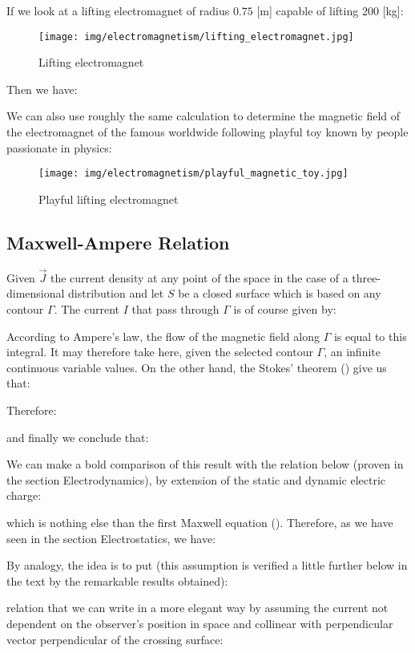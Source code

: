 	If we look at a lifting electromagnet of radius $0.75$ [m] capable of lifting $200$ [kg]:
	\begin{figure}[H]
		\centering
		\texttt{[image: img/electromagnetism/lifting\_electromagnet.jpg]}
		\caption{Lifting electromagnet}
	\end{figure}
	Then we have:
	
	We can also use roughly the same calculation to determine the magnetic field of the electromagnet of the famous worldwide following playful toy known by people passionate in physics:
	\begin{figure}[H]
		\centering
		\texttt{[image: img/electromagnetism/playful\_magnetic\_toy.jpg]}
		\caption{Playful lifting electromagnet}
	\end{figure}
	
	\pagebreak
	\subsection{Maxwell-Ampere Relation}
	Given $\vec{J}$ the current density at any point of the space in the case of a three-dimensional distribution and let $S$ be a closed surface which is based on any contour $\Gamma$. The current $I$ that pass through $\Gamma$ is of course given by:
	
	According to Ampere's law, the flow of the magnetic field along $\Gamma$ is equal to this integral. It may therefore take here, given the selected contour $\Gamma$, an infinite continuous variable values. On the other hand, the Stokes' theorem () give us that:
	
	Therefore:
	
	and finally we conclude that:
	
	We can make a bold comparison of this result with the relation below (proven in the section Electrodynamics), by extension of the static and dynamic electric charge:
	
	which is nothing else than the first Maxwell equation (). Therefore, as we have seen in the section Electrostatics, we have:
	
	By analogy, the idea is to put (this assumption is verified a little further below in the text by the remarkable results obtained):
	
	relation that we can write in a more elegant way by assuming the current not dependent on the observer's position in space and collinear with perpendicular vector perpendicular of the crossing surface:
	
